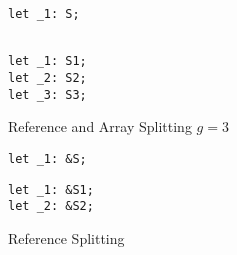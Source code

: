 \documentclass[prodmode,acmtecs]{acmsmall} %
\begin{document}
\begin{figure}
  \begin{minipage}[t]{0.5\linewidth}
\begin{verbatim}
let _1: S;
\end{verbatim}
  \end{minipage}
  \begin{minipage}[t]{0.5\linewidth}
\begin{verbatim}

let _1: S1;
let _2: S2;
let _3: S3;

\end{verbatim}
  \end{minipage}
  
  \caption{Reference and Array Splitting $g = 3$}
  \label{fig:localdeclbefore}
\end{figure}
\begin{figure}
  \begin{minipage}[t]{0.5\linewidth}
\begin{verbatim}
let _1: &S;
\end{verbatim}
  \end{minipage}
  \begin{minipage}[t]{0.5\linewidth}
\begin{verbatim}
let _1: &S1;
let _2: &S2;
\end{verbatim}
  \end{minipage}
  \caption{Reference Splitting}
  \label{fig:refedecl}
\end{figure}
\end{document}
